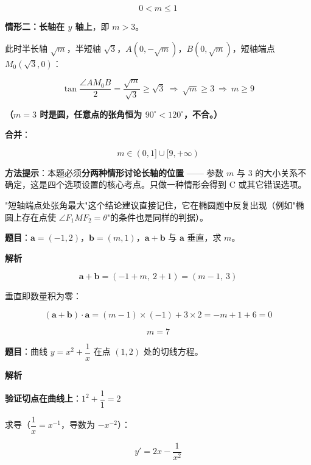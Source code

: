 \[0<m\le1\]

\textbf{情形二：长轴在 $y$ 轴上}，即 $m>3$。

此时半长轴 $\sqrt m$，半短轴 $\sqrt3$，$A\left(0,-\sqrt m\right)$，$B\left(0,\sqrt m\right)$，短轴端点 $M_0\left(\sqrt3,0\right)$：

\[\tan\frac{\angle AM_0B}2=\frac{\sqrt m}{\sqrt3}\ge\sqrt3\ \Longrightarrow\ \sqrt m\ge3\ \Longrightarrow\ m\ge9\]

\textbf{（$m=3$ 时是圆，任意点的张角恒为 $90^\circ<120^\circ$，不合。）}

\textbf{合并}：

\[m\in(0,1]\cup[9,+\infty)\]


\begin{gktip}
\textbf{方法提示}：本题必须\textbf{分两种情形讨论长轴的位置} —— 参数 $m$ 与 $3$ 的大小关系不确定，这是四个选项设置的核心考点。只做一种情形会得到 C 或其它错误选项。

"短轴端点处张角最大"这个结论建议直接记住，它在椭圆题中反复出现（例如"椭圆上存在点使 $\angle F_1MF_2=\theta$"的条件也是同样的判据）。
\end{gktip}

\par\medskip



\textbf{题目}：$\boldsymbol a=(-1,2)$，$\boldsymbol b=(m,1)$，$\boldsymbol a+\boldsymbol b$ 与 $\boldsymbol a$ 垂直，求 $m$。

\textbf{解析}

\[\boldsymbol a+\boldsymbol b=(-1+m,\ 2+1)=(m-1,\ 3)\]

垂直即数量积为零：

\[(\boldsymbol a+\boldsymbol b)\cdot\boldsymbol a=(m-1)\times(-1)+3\times2=-m+1+6=0\]

\[m=7\]


\par\medskip


\textbf{题目}：曲线 $y=x^{2}+\dfrac1x$ 在点 $(1,2)$ 处的切线方程。

\textbf{解析}

\textbf{验证切点在曲线上}：$1^{2}+\dfrac11=2$ 

求导（$\dfrac1x=x^{-1}$，导数为 $-x^{-2}$）：

\[y'=2x-\frac1{x^{2}}\]

